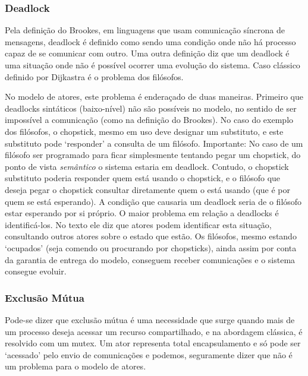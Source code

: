 \documentclass[]{article}
\begin{document}
		\subsubsection{Deadlock}
		\par Pela definição do Brookes, em linguagens que usam comunicação síncrona de mensagens, deadlock é definido
		como sendo uma condição onde não há processo capaz de se comunicar com outro. Uma outra definição diz que
		um deadlock é uma situação onde não é possível ocorrer uma evolução do sistema. Caso clássico definido
		por Dijkastra é o problema dos filósofos.

		\par No modelo de atores, este problema é enderaçado de duas maneiras. Primeiro que deadlocks sintáticos 
		(baixo-nível) não são possíveis no modelo, no sentido de ser impossível a comunicação (como na definição do
		Brookes). No caso do exemplo dos filósofos, o chopstick, mesmo em uso deve designar um substituto, e este
		substituto pode `responder' a consulta de um filósofo. Importante: No caso de um filósofo ser programado
		para ficar simplesmente tentando pegar um chopstick, do ponto de vista \emph{semântico} o sistema estaria
		em deadlock. Contudo, o chopstick substituto poderia responder quem está usando o chopstick, e o filósofo
		que deseja pegar o chopstick consultar diretamente quem o está usando (que é por quem se está esperando).
		A condição que causaria um deadlock seria de o filósofo estar esperando por si próprio. O maior problema
		em relação a deadlocks é identificá-los. No texto ele diz que atores podem identificar esta situação, 
		consultando outros atores sobre o estado que estão. Os filósofos, mesmo estando `ocupados' (seja comendo ou 
		procurando por chopsticks), ainda assim por conta da garantia de entrega do modelo, conseguem receber 
		comunicações e o sistema consegue evoluir.
		
		\subsubsection{Exclusão Mútua}
		\par Pode-se dizer que exclusão mútua é uma necessidade que surge quando mais de um processo deseja
		acessar um recurso compartilhado, e na abordagem clássica, é resolvido com um mutex. Um ator representa
		total encapsulamento e só pode ser `acessado' pelo envio de comunicações e podemos, seguramente dizer que
		não é um problema para o modelo de atores.
		
\end{document}
